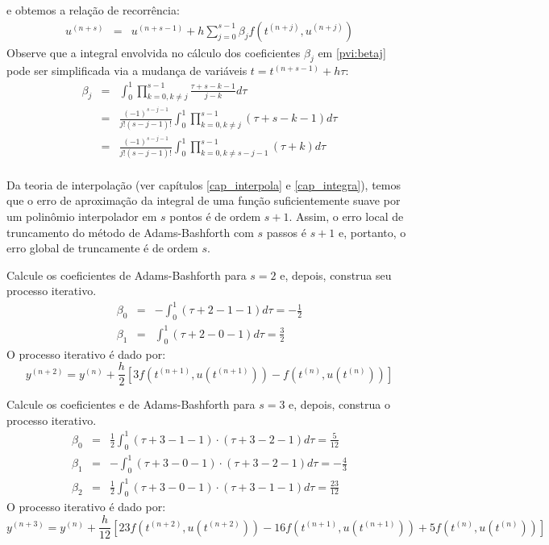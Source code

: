 e obtemos a relação de recorrência:
\begin{eqnarray}\label{pvi:mpm2}
  u^{(n+s)}  &=& u^{(n+s-1)}  + h\sum_{j=0}^{s-1}\beta_j f(t^{(n+j)},u^{(n+j)})
\end{eqnarray}
Observe que a integral envolvida no cálculo dos coeficientes $\beta_j$ em \eqref{pvi:betaj} pode ser simplificada via a mudança de variáveis $t=t^{(n+s-1)}+h\tau$:
\begin{eqnarray}\label{pvi:betaj_s}
\beta_j&=& \int_{0}^{1} \prod_{k=0,k\neq j}^{s-1} \frac{\tau+s-k-1}{j-k}d\tau\\
&=& \frac{(-1)^{s-j-1}}{j!(s-j-1)!}\int_{0}^{1} \prod_{k=0,k\neq j}^{s-1}(\tau+s-k-1)d\tau\\
&=& \frac{(-1)^{s-j-1}}{j!(s-j-1)!}\int_{0}^{1} \prod_{k=0,k\neq s-j-1}^{s-1}(\tau+k)d\tau\\
\end{eqnarray}


\begin{obs} Da teoria de interpolação (ver capítulos \ref{cap_interpola} e \ref{cap_integra}), temos que o erro de aproximação da integral de uma função suficientemente suave por um polinômio interpolador em $s$ pontos é de ordem $s+1$. Assim, o erro local de truncamento do método de Adams-Bashforth com $s$ passos é $s+1$ e, portanto, o erro global de truncamente é de ordem $s$.   
\end{obs}


\begin{ex} Calcule os coeficientes de Adams-Bashforth para $s=2$ e, depois, construa seu processo iterativo.
 \begin{eqnarray*}
  \beta_0&=&-\int_0^1 (\tau+2-1-1)d\tau=-\frac{1}{2}\\
  \beta_1&=&\int_0^1 (\tau+2-0-1)d\tau=\frac{3}{2}
 \end{eqnarray*}
 O processo iterativo é dado por:
 \begin{equation*}
  y^{(n+2)}=y^{(n)}+\frac{h}{2}\left[3f\left(t^{(n+1)},u(t^{(n+1)})\right)-f\left(t^{(n)},u(t^{(n)})\right)\right]
 \end{equation*}
\end{ex}


\begin{ex} Calcule os coeficientes e de Adams-Bashforth para $s=3$ e, depois, construa o processo iterativo.
 \begin{eqnarray*}
  \beta_0&=&\frac{1}{2}\int_0^1 {(\tau+3-1-1)}\cdot {(\tau+3-2-1)} d\tau=\frac{5}{12}\\
  \beta_1&=&-\int_0^1 {(\tau+3-0-1)}\cdot {(\tau+3-2-1)} d\tau=-\frac{4}{3}\\
  \beta_2&=&\frac{1}{2}\int_0^1 {(\tau+3-0-1)}\cdot {(\tau+3-1-1)} d\tau=\frac{23}{12}
 \end{eqnarray*}
 O processo iterativo é dado por:
 \begin{equation*}
  y^{(n+3)}=y^{(n)}+\frac{h}{12}\left[23f\left(t^{(n+2)},u(t^{(n+2)})\right)-16f\left(t^{(n+1)},u(t^{(n+1)})\right)+5f\left(t^{(n)},u(t^{(n)})\right)\right]
 \end{equation*}
\end{ex}


